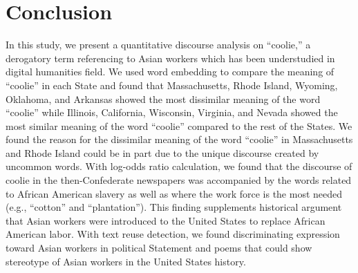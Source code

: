 \documentclass[11pt]{article}
\begin{document}
\section{Conclusion} \label{sec:conclusion}
In this study, we present a quantitative discourse analysis on ``coolie,'' 
a derogatory term referencing to Asian workers
which has been understudied in digital humanities field.
We used word embedding to compare the meaning of ``coolie'' in each State
and found that Massachusetts, Rhode Island, Wyoming, Oklahoma, and Arkansas
showed the most dissimilar meaning of the word ``coolie'' while Illinois, California, Wisconsin, Virginia, and Nevada
showed the most similar meaning of the word ``coolie'' compared to the rest of the States. 
We found the reason for the dissimilar meaning of the word ``coolie'' in Massachusetts and Rhode Island
could be in part due to the unique discourse created by uncommon words. 
With log-odds ratio calculation, we found that the discourse of coolie in the then-Confederate newspapers
was accompanied by the words related to African American slavery as well as where the 
work force is the most needed (e.g., ``cotton'' and ``plantation''). This finding supplements
historical argument that Asian workers were introduced to the United States to replace African American labor.
With text reuse detection, we found discriminating expression toward Asian workers 
in political Statement and poems that could show stereotype of Asian workers in the United States history. 
\end{document}
